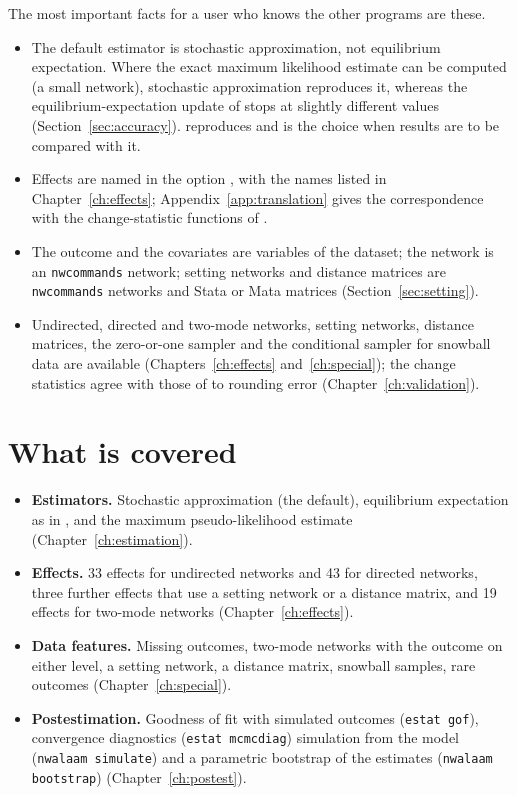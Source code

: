 The most important facts for a user who knows the other programs are these.
\begin{itemize}[nosep]
  \item The default estimator is stochastic approximation, not equilibrium expectation. Where the exact maximum likelihood estimate can be computed (a small network), stochastic approximation reproduces it, whereas the equilibrium-expectation update of \alaamee{} stops at slightly different values (Section~\ref{sec:accuracy}).  reproduces \alaamee{} and is the choice when results are to be compared with it.
  \item Effects are named in the option , with the names listed in Chapter~\ref{ch:effects}; Appendix~\ref{app:translation} gives the correspondence with the change-statistic functions of \alaamee{}.
  \item The outcome and the covariates are variables of the dataset; the network is an \texttt{nwcommands} network; setting networks and distance matrices are \texttt{nwcommands} networks and Stata or Mata matrices (Section~\ref{sec:setting}).
  \item Undirected, directed and two-mode networks, setting networks, distance matrices, the zero-or-one sampler and the conditional sampler for snowball data are available (Chapters~\ref{ch:effects} and~\ref{ch:special}); the change statistics agree with those of \alaamee{} to rounding error (Chapter~\ref{ch:validation}).
\end{itemize}

\section{What is covered}

\begin{itemize}[nosep]
  \item \textbf{Estimators.} Stochastic approximation (the default), equilibrium expectation as in \alaamee{}, and the maximum pseudo-likelihood estimate (Chapter~\ref{ch:estimation}).
  \item \textbf{Effects.} 33 effects for undirected networks and 43 for directed networks, three further effects that use a setting network or a distance matrix, and 19 effects for two-mode networks (Chapter~\ref{ch:effects}).
  \item \textbf{Data features.} Missing outcomes, two-mode networks with the outcome on either level, a setting network, a distance matrix, snowball samples, rare outcomes (Chapter~\ref{ch:special}).
  \item \textbf{Postestimation.} Goodness of fit with simulated outcomes (\texttt{estat gof}), convergence diagnostics (\texttt{estat mcmcdiag}) simulation from the model (\texttt{nwalaam simulate}) and a parametric bootstrap of the estimates (\texttt{nwalaam bootstrap}) (Chapter~\ref{ch:postest}).
\end{itemize}

